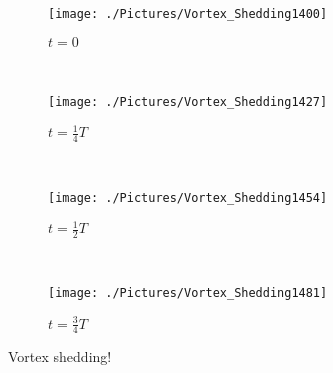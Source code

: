 \documentclass[10pt]{article}
\begin{document}
\begin{figure}
\begin{subfigure}{\linewidth}
  \centering
  \texttt{[image: ./Pictures/Vortex\_Shedding1400]}
  \caption{$t = 0$}
\end{subfigure} \\
\begin{subfigure}{\textwidth}
  \centering
  \texttt{[image: ./Pictures/Vortex\_Shedding1427]}
  \caption{$t = \frac{1}{4}T$}
\end{subfigure} \\
\begin{subfigure}{\linewidth}
  \centering
  \texttt{[image: ./Pictures/Vortex\_Shedding1454]}
  \caption{$t = \frac{1}{2}T$}
\end{subfigure} \\
\begin{subfigure}{\textwidth}
  \centering
  \texttt{[image: ./Pictures/Vortex\_Shedding1481]}
  \caption{$t = \frac{3}{4}T$}
\end{subfigure}
\caption{Vortex shedding!}
\label{fig:vortexshedding}
\end{figure}
\end{document}
